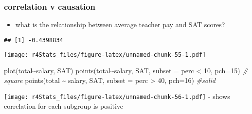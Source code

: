 \documentclass[
]{book}
\newenvironment{Shaded}{\begin{snugshade}}{\end{snugshade}}
\newcommand{\AttributeTok}[1]{\textcolor[rgb]{0.77,0.63,0.00}{#1}}
\newcommand{\CommentTok}[1]{\textcolor[rgb]{0.56,0.35,0.01}{\textit{#1}}}
\newcommand{\DecValTok}[1]{\textcolor[rgb]{0.00,0.00,0.81}{#1}}
\newcommand{\FunctionTok}[1]{\textcolor[rgb]{0.00,0.00,0.00}{#1}}
\newcommand{\NormalTok}[1]{#1}
\newcommand{\SpecialCharTok}[1]{\textcolor[rgb]{0.00,0.00,0.00}{#1}}
\providecommand{\tightlist}{%
  \setlength{\itemsep}{0pt}\setlength{\parskip}{0pt}}
\theoremstyle{definition}
\theoremstyle{definition}
\theoremstyle{definition}
\theoremstyle{definition}
\theoremstyle{remark}
\begin{document}
\hypertarget{correlation-v-causation}{%
\subsubsection{correlation v causation}\label{correlation-v-causation}}

\begin{itemize}
\tightlist
\item
  what is the relationship between average teacher pay and SAT scores?
\end{itemize}

\begin{Shaded}
\end{Shaded}

\begin{verbatim}
## [1] -0.4398834
\end{verbatim}

\begin{Shaded}
\end{Shaded}

\texttt{[image: r4Stats\_files/figure-latex/unnamed-chunk-55-1.pdf]}

\begin{Shaded}
\begin{Highlighting}[]
\FunctionTok{plot}\NormalTok{(total}\SpecialCharTok{\textasciitilde{}}\NormalTok{salary, SAT)}
\FunctionTok{points}\NormalTok{(total}\SpecialCharTok{\textasciitilde{}}\NormalTok{salary, SAT, }\AttributeTok{subset =}\NormalTok{ perc }\SpecialCharTok{\textless{}} \DecValTok{10}\NormalTok{, }\AttributeTok{pch=}\DecValTok{15}\NormalTok{)  }\CommentTok{\# square}
\FunctionTok{points}\NormalTok{(total }\SpecialCharTok{\textasciitilde{}}\NormalTok{ salary, SAT, }\AttributeTok{subset =}\NormalTok{ perc }\SpecialCharTok{\textgreater{}} \DecValTok{40}\NormalTok{, }\AttributeTok{pch=}\DecValTok{16}\NormalTok{) }\CommentTok{\#solid}
\end{Highlighting}
\end{Shaded}

\texttt{[image: r4Stats\_files/figure-latex/unnamed-chunk-56-1.pdf]}
- shows correlation for each subgroup is positive
\end{document}
